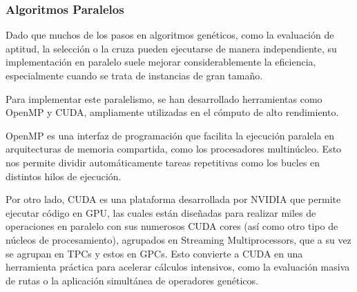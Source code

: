 \documentclass[main.tex]{subfiles}
\begin{document}
\begin{cajaEnunciado}
    \subsubsection*{Algoritmos Paralelos}
\end{cajaEnunciado}

Dado que muchos de los pasos en algoritmos genéticos, como la evaluación de
aptitud, la selección o la cruza pueden ejecutarse de manera independiente, su
implementación en paralelo suele mejorar considerablemente la eficiencia,
especialmente cuando se trata de instancias de gran tamaño.
\parencite{paralevol} \parencite{alba_ch2}

Para implementar este paralelismo, se han desarrollado herramientas como OpenMP
y CUDA, ampliamente utilizadas en el cómputo de alto rendimiento.

OpenMP es una interfaz de programación que facilita la ejecución paralela en
arquitecturas de memoria compartida, como los procesadores multinúcleo.
Esto nos permite dividir automáticamente tareas repetitivas como los bucles en
distintos hilos de ejecución. \parencite{omp}

Por otro lado, CUDA es una plataforma desarrollada por NVIDIA que permite
ejecutar código en GPU, las cuales están diseñadas para realizar miles de
operaciones en paralelo con sus numerosos CUDA cores (así como otro tipo de
núcleos de procesamiento), agrupados en Streaming Multiprocessors, que a su vez
se agrupan en TPCs y estos en GPCs. Esto convierte a CUDA en una herramienta
práctica para acelerar cálculos intensivos, como la evaluación masiva de rutas
o la aplicación simultánea de operadores genéticos. \parencite{cuda}
\parencite{ipn_gpu}
\end{document}
